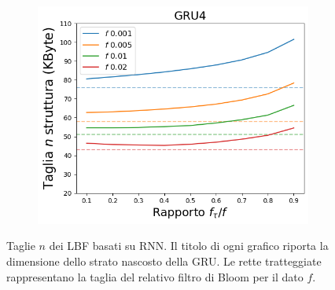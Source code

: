 \documentclass[../../main.tex]{subfiles}
\begin{document}
\begin{figure}[H]
\begin{subfigure}[b]{0.49\textwidth}
        \end{subfigure}
        \begin{subfigure}[b]{0.49\textwidth}
            \centering
            \includegraphics[width = \textwidth]{immagini/7/LBF/GRU4_Taglia.png}
            \caption{}
            \label{fig:LBFTagliaGRU4}
        \end{subfigure}
        \caption{Taglie $n$ dei LBF basati su RNN. Il titolo di ogni grafico riporta la dimensione dello strato nascosto della GRU. Le rette tratteggiate rappresentano la taglia del relativo filtro di Bloom per il dato $f$.}
        \label{fig:taglieGRULBF}
    \end{figure}
\end{document}
